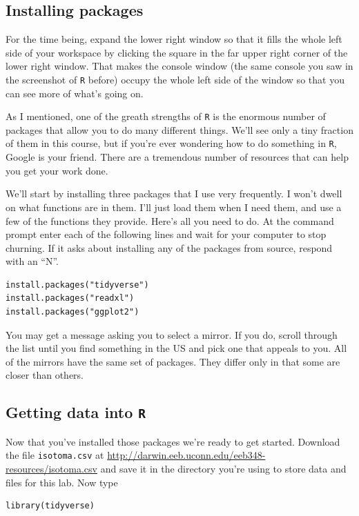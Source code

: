 \documentclass[12pt]{article}
\begin{document}
\subsection{Installing packages}

For the time being, expand the lower right window so that it fills the
whole left side of your workspace by clicking the square in the far
upper right corner of the lower right window. That makes the console
window (the same console you saw in the screenshot of {\tt R} before)
occupy the whole left side of the window so that you can see more of
what's going on.

As I mentioned, one of the greath strengths of {\tt R} is the enormous
number of packages that allow you to do many different things. We'll
see only a tiny fraction of them in this course, but if you're ever
wondering how to do something in {\tt R}, Google is your friend. There
are a tremendous number of resources that can help you get your work
done.

We'll start by installing three packages that I use very frequently. I
won't dwell on what functions are in them. I'll just load them when I
need them, and use a few of the functions they provide. Here's all you
need to do. At the command prompt enter each of the following lines
and wait for your computer to stop churning. If it asks about
installing any of the packages from source, respond with an ``N''.

\begin{verbatim}
install.packages("tidyverse")
install.packages("readxl")
install.packages("ggplot2")
\end{verbatim}

You may get a message asking you to select a mirror. If you do, scroll
through the list until you find something in the US and pick one that
appeals to you. All of the mirrors have the same set of packages. They
differ only in that some are closer than others.

\subsection{Getting data into {\tt R}}

Now that you've installed those packages we're ready to get
started. Download the file {\tt isotoma.csv} at
\url{http://darwin.eeb.uconn.edu/eeb348-resources/isotoma.csv} and
save it in the directory you're using to store data and files for this
lab. Now type

\begin{verbatim}
library(tidyverse)
\end{verbatim}
\end{document}
